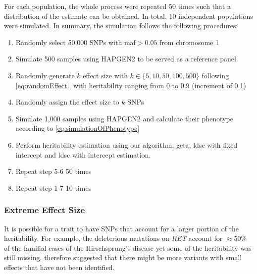 			For each population, the whole process were repeated 50 times such that a distribution of the estimate can be obtained. 
			In total, 10 independent populations were simulated.
			In summary, the simulation follows the following procedures:
			\begin{enumerate}
				\item Randomly select 50,000 \glspl{SNP} with \gls{maf}$>0.05$ from chromosome 1
				\item Simulate 500 samples using HAPGEN2 to be served as a reference panel
				\item Randomly generate $k$ effect size with $k \in \{5,10,50,100,500\}$ following \cref{eq:randomEffect}, with heritability ranging from 0 to 0.9 (increment of 0.1)
				\item Randomly assign the effect size to $k$ \glspl{SNP}
				\item Simulate 1,000 samples using HAPGEN2 and calculate their phenotype according to \cref{eq:simulationOfPhenotype}
				\item Perform heritability estimation using our algorithm, \gls{gcta}, \gls{ldsc} with fixed intercept and \gls{ldsc} with intercept estimation.
				\item Repeat step 5-6 50 times
				\item Repeat step 1-7 10 times
			\end{enumerate}
		
		\subsubsection{Extreme Effect Size}
		It is possible for a trait to have \glspl{SNP} that account for a larger portion of the heritability.
		For example, the deleterious mutations on \textit{RET} account for $\approx50\%$ of the familial cases of the Hirschsprung's disease yet some of the heritability was still missing.
		\citet{Gui2013} therefore suggested that there might be more variants with small effects that have not been identified.
		
